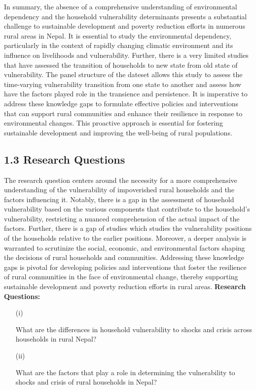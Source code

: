 In summary, the absence of a comprehensive understanding of environmental dependency and the household vulnerability determinants presents a substantial challenge to sustainable development and poverty reduction efforts in numerous rural areas in Nepal. It is essential to study the environmental dependency, particularly in the context of rapidly changing climatic environment and its influence on livelihoods and vulnerability. Further, there is a very limited studies that have assessed the transition of households to new state from old state of vulnerability. The panel structure of the dateset allows this study to assess the time-varying vulnerability transition from one state to another and assess how have the factors played role in the transience and persistence. It is imperative to address these knowledge gaps to formulate effective policies and interventions that can support rural communities and enhance their resilience in response to environmental changes. This proactive approach is essential for fostering sustainable development and improving the well-being of rural populations.

\subsection*{1.3 Research Questions}
\renewcommand{\thepage}{\arabic{page}}
The research question centers around the necessity for a more comprehensive understanding of the vulnerability of impoverished rural households and the factors influencing it. Notably, there is a gap in the assessment of household vulnerability based on the various components that contribute to the household's vulnerability, restricting a nuanced comprehension of the actual impact of the factors. Further, there is a gap of studies which studies the vulnerability positions of the households relative to the earlier positions. Moreover, a deeper analysis is warranted to scrutinize the social, economic, and environmental factors shaping the decisions of rural households and communities. Addressing these knowledge gaps is pivotal for developing policies and interventions that foster the resilience of rural communities in the face of environmental change, thereby supporting sustainable development and poverty reduction efforts in rural areas.
\vspace{1cm}
\newline
\textbf{Research Questions:} 
\begin{enumerate}
	\item[(i)] \parbox[t]{\linewidth}{What are the differences in household vulnerability to shocks and crisis across households in rural Nepal?}
	\item [(ii)] \parbox[t]{\linewidth}{What are the factors that play a role in determining the vulnerability to shocks and crisis of rural households in Nepal?}
\end{enumerate}

